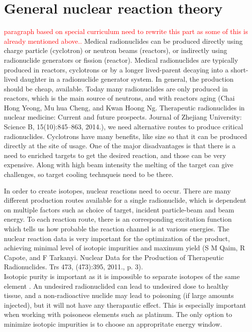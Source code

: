 \chapter{General nuclear reaction theory}

\textcolor{red}{paragraph based on special curriculum}
\textcolor{red}{need to rewrite this part as some of this is already mentioned above.. }
Medical radionuclides can be produced directly using charge particle (cyclotron) or neutron beams (reactors), or indirectly using radionuclide generators or fission (reactor). Medical radionuclides are typically produced in reactors, cyclotrons or by a longer lived-parent decaying into a short-lived daughter in a radionuclide generator system. In general, the production should be cheap, available. Today many radionuclides are only produced in reactors, which is the main source of neutrons, and with reactors aging (Chai Hong Yeong, Mu hua Cheng, and Kwan Hoong Ng. Therapeutic radionuclides in nuclear medicine: Current and future prospects. Journal of Zhejiang University: Science B,
15(10):845–863, 2014.), we need alternative routes to produce critical radionuclides. Cyclotrons have many benefits, like size so that it can be produced directly at the site of usage. One of the major disadvantages is that there is a need to enriched targets to get the desired reaction, and those can be very expensive. Along with high beam intensity the melting of the target can give challenges, so target cooling technqueis need to be there.    

In order to create isotopes, nuclear reactions need to occur. There are many different production routes available for a single radionuclide, which is dependent on multiple factors such as choice of target, incident particle-beam and beam energy. To each reaction route, there is an corresponding excitation function which tells us how probable the reaction channel is at various energies. The nuclear reaction data is very important for the optimization of the product, achieving minimal level of isotopic impurities and maximum yield (S M Qaim, R Capote, and F Tarkanyi. Nuclear Data for the Production of Therapeutic Radionuclides.
Trs 473, (473):395, 2011., p. 3). \\

Isotopic purity is important as it is impossible to separate isotopes of the same element \cite{Qaim2017c}. An undesired radionuclided can lead to undesired dose to healthy tissue, and a non-radioactive nuclide may lead to  poisoning (if large amounts injected), but it will not have any therapautic effect. This is especially important when working with poisoneos elements such as platinum. The only option to minimize isotopic impurities is to choose an appropritate energy window. 


